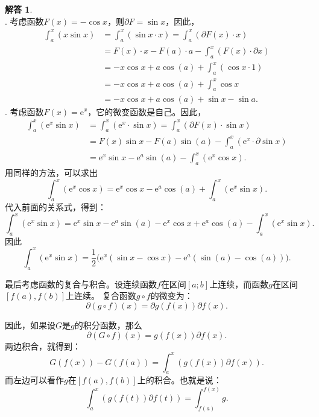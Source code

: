 \documentclass[12pt,UTF8]{ctexbook}
\theoremstyle{definition}
\newtheorem*{so}{解答}
\theoremstyle{plain}
\begin{document}
\begin{so}    
    \mbox{} \\
    . 考虑函数$F(x) = -\cos{x}$，则$\partial F = \sin{x}$，因此，
    \begin{align*}
        \int_a^x (x\sin{x}) &= \int_a^x (\sin{x}\cdot x) = \int_a^x (\partial F(x) \cdot x) \\
        &= F(x)\cdot x - F(a)\cdot a - \int_a^x (F(x) \cdot \partial x) \\
        &= -x\cos{x} + a\cos(a) + \int_a^x (\cos{x} \cdot 1) \\
        &= -x\cos{x} + a\cos(a) + \int_a^x \cos{x} \\
        &= -x\cos{x} + a\cos(a) + \sin{x} - \sin{a}.
    \end{align*}
    . 考虑函数$F(x) = \mathrm{e}^x$，它的微变函数是自己。因此，
    \begin{align*}
        \int_a^x \left(\mathrm{e}^{x} \sin{x}\right) &= \int_a^x \left(\mathrm{e}^x\cdot \sin{x}\right) = \int_a^x \left(\partial F(x) \cdot \sin{x}\right) \\
        &= F(x)\sin{x} - F(a)\sin(a) - \int_a^x \left(\mathrm{e}^{x} \cdot \partial \sin{x}\right) \\
        &= \mathrm{e}^x\sin{x} - \mathrm{e}^a\sin(a) - \int_a^x \left(\mathrm{e}^x \cos{x}\right) .
    \end{align*}
    用同样的方法，可以求出
    $$  \int_a^x \left(\mathrm{e}^x \cos{x}\right) = \mathrm{e}^x\cos{x} - \mathrm{e}^a\cos(a) + \int_a^x \left(\mathrm{e}^{x} \sin{x}\right). $$
    代入前面的关系式，得到：
    $$ \int_a^x \left(\mathrm{e}^{x} \sin{x}\right) = \mathrm{e}^x\sin{x} - \mathrm{e}^a\sin(a) - \mathrm{e}^x\cos{x} + \mathrm{e}^a\cos(a) - \int_a^x \left(\mathrm{e}^{x} \sin{x}\right). $$
    因此
    $$ \int_a^x \left(\mathrm{e}^{x} \sin{x}\right) = \frac{1}{2}\big(\mathrm{e}^x(\sin{x} - \cos{x}) - \mathrm{e}^a(\sin(a) - \cos(a))\big).$$
\end{so}

最后考虑函数的复合与积合。设连续函数$f$在区间$[a; b]$上连续，而函数$g$在区间$[f(a), f(b)]$上连续。
复合函数$g\circ f$的微变为：
$$ \partial (g \circ f) (x) = \partial g(f(x)) \partial f (x). $$

因此，如果设$G$是$g$的积分函数，那么
$$ \partial (G \circ f) (x) = g(f(x)) \partial f (x). $$
两边积合，就得到：
$$ G(f(x)) - G(f(a)) = \int_a^x \left( g(f(x)) \partial f (x) \right).$$
而左边可以看作$g$在$[f(a), f(b)]$上的积合。也就是说：
$$ \int_a^x \left( g(f(t)) \partial f (t) \right) = \int_{f(a)}^{f(x)} g.$$
\end{document}
